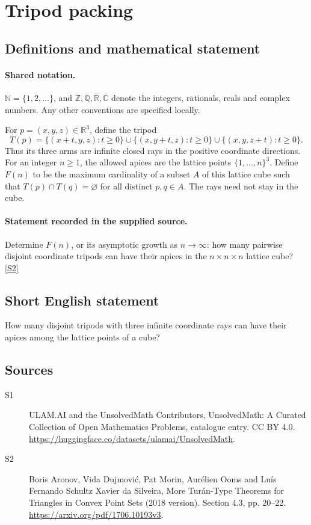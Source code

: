 \documentclass[11pt]{article}
\newcommand{\sref}[2]{\hyperlink{source:#1:#2}{[S#2]}}
\begin{document}
\section{Tripod packing}\label{statement}

\subsection{Definitions and mathematical statement}

\paragraph{Shared notation.}$\mathbb N=\{1,2,\ldots\}$, and $\mathbb Z,\mathbb Q,\mathbb R,\mathbb C$ denote the integers, rationals, reals and complex numbers. Any other conventions are specified locally.


For $p=(x,y,z)\in\mathbb R^3$, define the tripod
\[T(p)=\{(x+t,y,z):t\geq0\}\cup\{(x,y+t,z):t\geq0\}\cup\{(x,y,z+t):t\geq0\}.\]
Thus its three arms are infinite closed rays in the positive coordinate directions. For an integer $n\geq1$, the allowed apices are the lattice points $\{1,\ldots,n\}^3$. Define $F(n)$ to be the maximum cardinality of a subset $A$ of this lattice cube such that $T(p)\cap T(q)=\varnothing$ for all distinct $p,q\in A$. The rays need not stay in the cube.
\paragraph{Statement recorded in the supplied source.}
Determine $F(n)$, or its asymptotic growth as $n\to\infty$: how many pairwise disjoint coordinate tripods can have their apices in the $n\times n\times n$ lattice cube? \sref{statement}{2}
\subsection{Short English statement}
How many disjoint tripods with three infinite coordinate rays can have their apices among the lattice points of a cube?
\subsection{Sources}
\begin{description}
\item[\hypertarget{source:statement:1}{S1}] ULAM.AI and the UnsolvedMath Contributors, UnsolvedMath: A Curated Collection of Open Mathematics Problems, catalogue entry. CC BY 4.0. \url{https://huggingface.co/datasets/ulamai/UnsolvedMath}.
\item[\hypertarget{source:statement:2}{S2}] Boris Aronov, Vida Dujmović, Pat Morin, Aurélien Ooms and Luís Fernando Schultz Xavier da Silveira, More Turán-Type Theorems for Triangles in Convex Point Sets (2018 version). Section 4.3, pp. 20–22. \url{https://arxiv.org/pdf/1706.10193v3}.
\end{description}
\label{end:statement}
\end{document}
